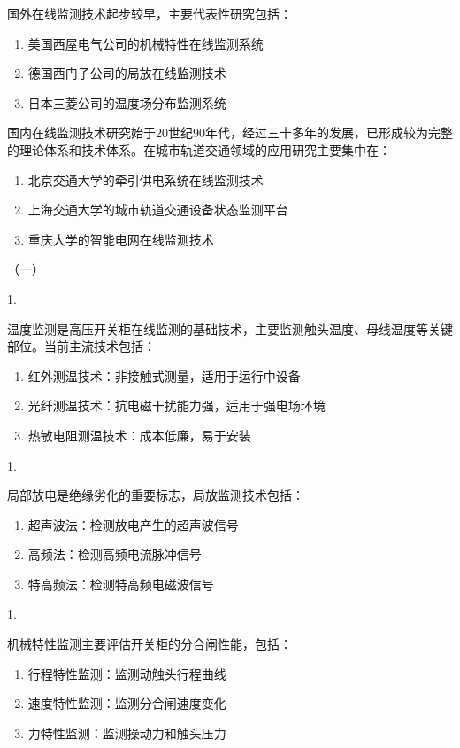 国外在线监测技术起步较早，主要代表性研究包括：
\begin{enumerate}
    \item 美国西屋电气公司的机械特性在线监测系统
    \item 德国西门子公司的局放在线监测技术
    \item 日本三菱公司的温度场分布监测系统
\end{enumerate}

国内在线监测技术研究始于20世纪90年代，经过三十多年的发展，已形成较为完整的理论体系和技术体系。在城市轨道交通领域的应用研究主要集中在：
\begin{enumerate}
    \item 北京交通大学的牵引供电系统在线监测技术
    \item 上海交通大学的城市轨道交通设备状态监测平台
    \item 重庆大学的智能电网在线监测技术
\end{enumerate}

（一）

1.

温度监测是高压开关柜在线监测的基础技术，主要监测触头温度、母线温度等关键部位。当前主流技术包括：
\begin{enumerate}
    \item 红外测温技术：非接触式测量，适用于运行中设备
    \item 光纤测温技术：抗电磁干扰能力强，适用于强电场环境
    \item 热敏电阻测温技术：成本低廉，易于安装
\end{enumerate}

1.

局部放电是绝缘劣化的重要标志，局放监测技术包括：
\begin{enumerate}
    \item 超声波法：检测放电产生的超声波信号
    \item 高频法：检测高频电流脉冲信号
    \item 特高频法：检测特高频电磁波信号
\end{enumerate}

1.

机械特性监测主要评估开关柜的分合闸性能，包括：
\begin{enumerate}
    \item 行程特性监测：监测动触头行程曲线
    \item 速度特性监测：监测分合闸速度变化
    \item 力特性监测：监测操动力和触头压力
\end{enumerate}

